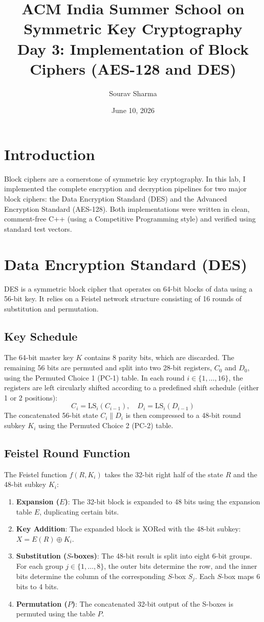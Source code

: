 \documentclass{article}
\title{ACM India Summer School on Symmetric Key Cryptography \\ Day 3: Implementation of Block Ciphers (AES-128 and DES)}
\author{Sourav Sharma}
\date{June 10, 2026}
\begin{document}
\maketitle

\section{Introduction}
Block ciphers are a cornerstone of symmetric key cryptography. In this lab, I implemented the complete encryption and decryption pipelines for two major block ciphers: the Data Encryption Standard (DES) and the Advanced Encryption Standard (AES-128). Both implementations were written in clean, comment-free C++ (using a Competitive Programming style) and verified using standard test vectors.

\section{Data Encryption Standard (DES)}

DES is a symmetric block cipher that operates on 64-bit blocks of data using a 56-bit key. It relies on a Feistel network structure consisting of 16 rounds of substitution and permutation.

\subsection{Key Schedule}
The 64-bit master key $K$ contains 8 parity bits, which are discarded. The remaining 56 bits are permuted and split into two 28-bit registers, $C_0$ and $D_0$, using the Permuted Choice 1 (PC-1) table.
In each round $i \in \{1, \dots, 16\}$, the registers are left circularly shifted according to a predefined shift schedule (either 1 or 2 positions):
\[ C_i = \text{LS}_i(C_{i-1}), \quad D_i = \text{LS}_i(D_{i-1}) \]
The concatenated 56-bit state $C_i \parallel D_i$ is then compressed to a 48-bit round subkey $K_i$ using the Permuted Choice 2 (PC-2) table.

\subsection{Feistel Round Function}
The Feistel function $f(R, K_i)$ takes the 32-bit right half of the state $R$ and the 48-bit subkey $K_i$:
\begin{enumerate}
    \item \textbf{Expansion ($E$)}: The 32-bit block is expanded to 48 bits using the expansion table $E$, duplicating certain bits.
    \item \textbf{Key Addition}: The expanded block is XORed with the 48-bit subkey: $X = E(R) \oplus K_i$.
    \item \textbf{Substitution ($S$-boxes)}: The 48-bit result is split into eight 6-bit groups. For each group $j \in \{1, \dots, 8\}$, the outer bits determine the row, and the inner bits determine the column of the corresponding $S$-box $S_j$. Each $S$-box maps 6 bits to 4 bits.
    \item \textbf{Permutation ($P$)}: The concatenated 32-bit output of the S-boxes is permuted using the table $P$.
\end{enumerate}
\end{document}
